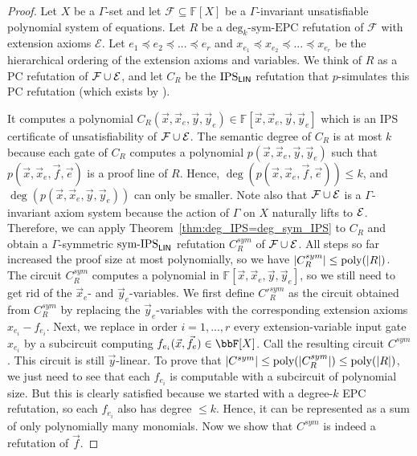 \documentclass[10pt,a4paper]{article}
\newcommand{\EPC}{\mathrm{EPC}}
\newcommand{\Ee}{{\cal E}}
\newcommand{\Ff}{{\cal F}}
\newcommand{\poly}{\text{\upshape poly}}
\newcommand{\Field}{\ensuremath{\mathbb{F}}}
\newcommand{\F}{\ensuremath{\mathcal{F}}}
\newcommand{\IPSlin}{\text{\upshape IPS}_{\mathsf{LIN}}}
\newcommand{\symIPSlin}{\text{ \upshape sym-IPS}_{\mathsf{LIN}}}
\begin{document}
\begin{proof}
	Let $X$ be a $\Gamma$-set and let $\F \subseteq \Field[X]$
	be a $\Gamma$-invariant unsatisfiable polynomial system of equations.
	Let $R$ be a $\mathrm{deg}_k \text{-}\mathrm{sym}\text{-}\EPC$ refutation of $\F$ with 	extension axioms $\mathcal{E}$. 
	Let $e_1 \preceq e_2 \preceq ...\preceq e_r$ 
	and $x_{e_1}\preceq x_{e_2} \preceq ...\preceq x_{e_r}$ be
	the hierarchical ordering of the extension axioms and variables.
	We think of $R$ as a PC refutation of $\F \cup \Ee$, and let $C_R$ be the $\IPSlin$ refutation that $p$-simulates this PC refutation (which exists by \cite[Proposition 3.4]{IPS}).
	
	It computes a polynomial 
	$C_R(\vec x, \vec x_e, \vec y, \vec y_e)\in \Field[\vec x, \vec x_e,\vec y, \vec y_e ]$ which is an IPS certificate of unsatisfiability of $\Ff \cup \Ee$. The semantic degree of $C_R$ is at most $k$ because each gate of $C_R$ computes a polynomial $p(\vec x, \vec x_e, \vec y, \vec y_e)$ such that $p(\vec x, \vec x_e, \vec f, \vec e)$ is a proof line of $R$. Hence, $\deg(p(\vec x, \vec x_e, \vec f, \vec e)) \leq k$, and $\deg(p(\vec x, \vec x_e, \vec y, \vec y_e))$ can only be smaller.
	Note also that $\Ff \cup \Ee$ is a $\Gamma$-invariant axiom system because the action of $\Gamma$ on $X$ naturally lifts to $\Ee$.
	Therefore, we can apply Theorem~\ref{thm:deg_IPS=deg_sym_IPS} to $C_R$ and obtain a $\Gamma$-symmetric$\symIPSlin$ refutation $C^{sym}_R$ of $\Ff \cup \Ee$. 
	All steps so far increased the proof size at most polynomially, so we have $|C^{sym}_R| \leq \poly(|R|)$.\\
	The circuit $C^{sym}_R$ computes a polynomial in $\Field[\vec x, \vec x_e,\vec y, \vec y_e]$, so we still need to get rid of the $\vec x_e$- and $\vec y_e$-variables. We first define $C'^{sym}_R$ as the circuit obtained from $C^{sym}_R$ by replacing the $\vec y_e$-variables with the corresponding extension axioms $x_{e_i} - f_{e_i}$. 
	Next, we replace in order $i=1, ..., r$ every extension-variable input gate $x_{e_i}$ by a subcircuit computing $f_{e_i}(\vec x, \vec f_e) \in \bbF[X]$. Call the resulting circuit $C^{sym}$. This circuit is still $\vec y$-linear. To prove that $|C^{sym}| \leq \poly(|C^{sym}_R|) \leq \poly(|R|)$, we just need to see that each $f_{e_i}$ is computable with a subcircuit of polynomial size. But this is clearly satisfied because we started with a degree-$k$ EPC refutation, so each $f_{e_i}$ also has degree $\leq k$. Hence, it can be represented as a sum of only polynomially many monomials. 
	Now we show that $C^{sym}$ is indeed a refutation of $\vec f$.

\end{proof}
\end{document}

